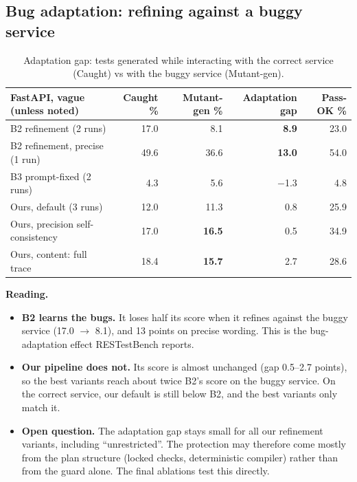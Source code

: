\documentclass[11pt,a4paper]{article}
\newcommand{\up}[1]{\textbf{\color{accent}#1}}
\newcommand{\down}[1]{\textbf{\color{warn}#1}}
\begin{document}
\subsection{Bug adaptation: refining against a buggy service}\label{sec:adapt}
\begin{table}[H]\centering\small
\begin{tabular}{lrrrr}\toprule
FastAPI, vague (unless noted) & Caught \% & Mutant-gen \% & Adaptation gap & Pass-OK \%\\\midrule
B2 refinement (2 runs) & 17.0 & 8.1 & \down{8.9} & 23.0\\
B2 refinement, precise (1 run) & 49.6 & 36.6 & \down{13.0} & 54.0\\
B3 prompt-fixed (2 runs) & 4.3 & 5.6 & $-$1.3 & 4.8\\
\midrule
Ours, default (3 runs) & 12.0 & 11.3 & 0.8 & 25.9\\
Ours, precision self-consistency & 17.0 & \up{16.5} & 0.5 & 34.9\\
Ours, content: full trace & 18.4 & \up{15.7} & 2.7 & 28.6\\
\bottomrule\end{tabular}
\caption{Adaptation gap: tests generated while interacting with the correct service (Caught) vs with the buggy service (Mutant-gen).}
\end{table}
\textbf{Reading.}
\begin{itemize}
\item \textbf{B2 learns the bugs.} It loses half its score when it refines against the buggy service (17.0 $\to$ 8.1), and 13 points on precise wording. This is the bug-adaptation effect RESTestBench reports.
\item \textbf{Our pipeline does not.} Its score is almost unchanged (gap 0.5--2.7 points), so the best variants reach about twice B2's score on the buggy service. On the correct service, our default is still below B2, and the best variants only match it.
\item \textbf{Open question.} The adaptation gap stays small for all our refinement variants, including ``unrestricted''. The protection may therefore come mostly from the plan structure (locked checks, deterministic compiler) rather than from the guard alone. The final ablations test this directly.
\end{itemize}

\end{document}
